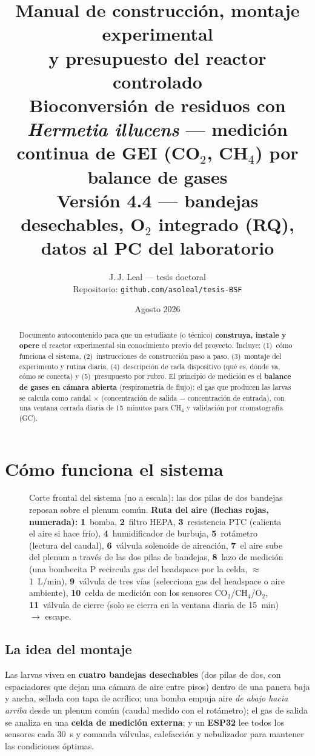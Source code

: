 \documentclass[11pt,a4paper]{article}
\title{\textbf{Manual de construcción, montaje experimental\\
y presupuesto del reactor controlado}\\[4pt]
\large Bioconversión de residuos con \emph{Hermetia illucens} --- medición
continua de GEI (CO$_2$, CH$_4$) por balance de gases\\
\large Versión 4.4 --- bandejas desechables, O$_2$ integrado (RQ), datos al PC del laboratorio}
\author{J.\,J. Leal --- tesis doctoral\\Repositorio: \texttt{github.com/asoleal/tesis-BSF}}
\date{Agosto 2026}
\begin{document}
\maketitle

\begin{abstract}
\noindent Documento autocontenido para que un estudiante (o técnico)
\textbf{construya, instale y opere} el reactor experimental sin conocimiento
previo del proyecto. Incluye: (1)~cómo funciona el sistema, (2)~instrucciones
de construcción paso a paso, (3)~montaje del experimento y rutina diaria,
(4)~descripción de cada dispositivo (qué es, dónde va, cómo se conecta) y
(5)~presupuesto por rubro. El principio de medición es el \textbf{balance de
gases en cámara abierta} (respirometría de flujo): el gas que producen las
larvas se calcula como caudal $\times$ (concentración de salida $-$
concentración de entrada), con una ventana cerrada diaria de 15~minutos para
CH$_4$ y validación por cromatografía (GC).
\end{abstract}

\tableofcontents
\newpage

\section{Cómo funciona el sistema}

\begin{figure}[h!]
\centering
\resizebox{\textwidth}{!}{}
\caption{Corte frontal del sistema (no a escala): las dos pilas de dos
bandejas reposan sobre el plenum común. \textbf{Ruta del aire
(flechas rojas, numerada):} \textbf{1}~bomba, \textbf{2}~filtro HEPA,
\textbf{3}~resistencia PTC (calienta el aire si hace frío),
\textbf{4}~humidificador de burbuja, \textbf{5}~rotámetro (lectura del
caudal), \textbf{6}~válvula solenoide de aireación, \textbf{7}~el aire sube
del plenum a través de las dos pilas de bandejas, \textbf{8}~lazo de
medición (una bombecita P recircula gas del headspace por la celda,
${\approx}$1~L/min), \textbf{9}~válvula de tres vías (selecciona gas del
headspace o aire ambiente), \textbf{10}~celda de medición con los sensores
CO$_2$/CH$_4$/O$_2$, \textbf{11}~válvula de cierre (solo se cierra en la
ventana diaria de 15~min) $\rightarrow$ escape.}
\label{fig:esquema}
\end{figure}

\subsection{La idea del montaje}
Las larvas viven en \textbf{cuatro bandejas desechables} (dos pilas de dos,
con espaciadores que dejan una cámara de aire entre pisos) dentro de una
panera baja y ancha, sellada con tapa de acrílico; una bomba empuja aire
\emph{de abajo hacia arriba} desde un plenum común (caudal medido con el
rotámetro); el gas de salida se analiza en una \textbf{celda de medición
externa}; y un \textbf{ESP32} lee todos los sensores cada 30~s y comanda
válvulas, calefacción y nebulizador para mantener las condiciones óptimas.
\end{document}

